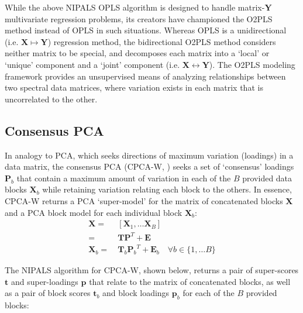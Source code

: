 \begin{doublespace}
While the above NIPALS OPLS algorithm is designed to handle matrix-$\mathbf{Y}$
multivariate regression problems, its creators have championed the O2PLS
\cite{trygg:jchemo2003} method instead of OPLS in such situations. Whereas OPLS
is a unidirectional (i.e. $\mathbf{X} \mapsto \mathbf{Y}$) regression method,
the bidirectional O2PLS method considers neither matrix to be special, and
decomposes each matrix into a `local' or `unique' component and a `joint'
component (i.e. $\mathbf{X} \leftrightarrow \mathbf{Y}$). The O2PLS modeling
framework provides an unsupervised means of analyzing relationships between
two spectral data matrices, where variation exists in each matrix that is
uncorrelated to the other.
\end{doublespace}

\subsection{Consensus PCA}

\begin{doublespace}
In analogy to PCA, which seeks directions of maximum variation (loadings) in a
data matrix, the consensus PCA (CPCA-W,
\cite{westerhuis:jchemo1998,smilde:jchemo2003}) seeks
a set of `consensus' loadings $\mathbf{P}_b$ that contain a maximum amount
of variation in each of the $B$ provided data blocks $\mathbf{X}_b$ while
retaining variation relating each block to the others. In essence, CPCA-W
returns a PCA `super-model' for the matrix of concatenated blocks $\mathbf{X}$
and a PCA block model for each individual block $\mathbf{X}_b$:
\begin{align}
\mathbf{X} =& \: [\mathbf{X}_1, \dots \mathbf{X}_B] \\
           =& \: \mathbf{T} \mathbf{P}^T + \mathbf{E} \\
\mathbf{X}_b =& \: \mathbf{T}_b {\mathbf{P}_b}^T + \mathbf{E}_b
 \quad \forall b \in \{1, \dots B\}
\end{align}

The NIPALS algorithm for CPCA-W, shown below, returns a pair of super-scores
$\mathbf{t}$ and super-loadings $\mathbf{p}$ that relate to the matrix of
concatenated blocks, as well as a pair of block scores $\mathbf{t}_b$ and
block loadings $\mathbf{p}_b$ for each of the $B$ provided blocks:
\end{doublespace}

